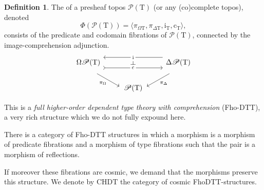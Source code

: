\documentclass[conference]{IEEEtran}
\theoremstyle{definition}
\newtheorem{definition}[theorem]{Definition}
\newcommand{\define}[1]{{\bf \boldmath{#1}}}
\newcommand{\msc}[1]{\mathscr{#1}}
\newcommand{\mrm}[1]{\mathrm{#1}}
\newcommand{\lrh}{\leftrightharpoons}
\newcommand{\T}{\mrm{T}}
\newcommand{\pow}{\msc{P}}
\begin{document}
\begin{definition}
    The \define{native structure} of a presheaf topos $\pow(\T)$ (or any (co)complete topos), denoted \[\Phi(\pow(\T))=\langle \pi_{\Omega\T},\pi_{\Delta\T},\mrm{i}_\T,\mrm{c}_\T\rangle,\] consists of the predicate and codomain fibrations of $\pow(\T)$, connected by the image-comprehension adjunction.
    \[\begin{tikzcd}
    	{\Omega\pow(\T)} && {\Delta\pow(\T)} \\
    	& {\pow(\T)}
    	\arrow["{\mrm{c}}"{name=0, description}, from=1-1, to=1-3, shift right=3, tail]
    	\arrow["\mrm{i}"{name=1, description}, from=1-3, to=1-1, shift right=3]
    	\arrow["{\pi_\Delta}", from=1-3, to=2-2, shift left=3]
    	\arrow["{\pi_\Omega}"', from=1-1, to=2-2, shift right=3]
    	\arrow["\dashv"{rotate=-90}, from=1, to=0, phantom]
    \end{tikzcd}\]
\end{definition}

This is a \textit{full higher-order dependent type theory with comprehension} \cite[Sec. 11.6]{jacobs} (Fho-DTT), a very rich structure which we do not fully expound here.

There is a category of Fho-DTT structures in which a morphism is a morphism of predicate fibrations and a morphism of type fibrations such that the pair is a morphism of reflections.


If moreover these fibrations are cosmic, we demand that the morphisms preserve this structure. We denote by $\mrm{CHDT}$ the category of cosmic FhoDTT-structures.
\end{document}
